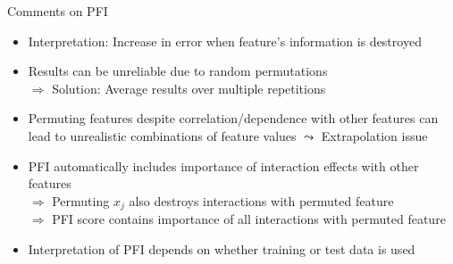 \documentclass[10pt,compress,t,notes=noshow, xcolor=table]{beamer}
\begin{document}
\begin{frame}{Comments on PFI}
 \begin{itemize}[<+->]
 \itemsep1em
  \item Interpretation: Increase in error when feature's information is destroyed
  \item Results can be unreliable due to random permutations \\
  $\Rightarrow$ Solution: Average results over multiple repetitions
  \item Permuting features despite correlation/dependence with other features can lead to unrealistic combinations of feature values 
  $\leadsto$ Extrapolation issue %
  \item PFI automatically includes importance of interaction effects with other features \\
  $\Rightarrow$ Permuting $x_j$ also destroys interactions with permuted feature\\
  $\Rightarrow$ PFI score contains importance of all interactions with permuted feature %
  \item Interpretation of PFI depends on whether training or test data is used
 \end{itemize}
\end{frame}
\end{document}
